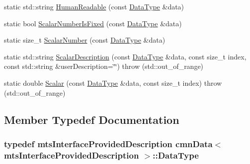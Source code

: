 \begin{DoxyCompactItemize}
\item 
static std\-::string \hyperlink{classcmn_data_3_01mts_interface_provided_description_01_4_ab45ebb352f76f32dc5d39ed6492370ad}{Human\-Readable} (const \hyperlink{classcmn_data_3_01mts_interface_provided_description_01_4_af19cd473dc5065308646606d55246bc6}{Data\-Type} \&data)
\item 
static bool \hyperlink{classcmn_data_3_01mts_interface_provided_description_01_4_a09ac4bf1060374d60412dbc8b19436f0}{Scalar\-Number\-Is\-Fixed} (const \hyperlink{classcmn_data_3_01mts_interface_provided_description_01_4_af19cd473dc5065308646606d55246bc6}{Data\-Type} \&data)
\item 
static size\-\_\-t \hyperlink{classcmn_data_3_01mts_interface_provided_description_01_4_ab66bf49c31e15615e90eb7e0dfdd7022}{Scalar\-Number} (const \hyperlink{classcmn_data_3_01mts_interface_provided_description_01_4_af19cd473dc5065308646606d55246bc6}{Data\-Type} \&data)
\item 
static std\-::string \hyperlink{classcmn_data_3_01mts_interface_provided_description_01_4_a609370f71724a052a4da55025660c23c}{Scalar\-Description} (const \hyperlink{classcmn_data_3_01mts_interface_provided_description_01_4_af19cd473dc5065308646606d55246bc6}{Data\-Type} \&data, const size\-\_\-t index, const std\-::string \&user\-Description=\char`\"{}\char`\"{})  throw (std\-::out\-\_\-of\-\_\-range)
\item 
static double \hyperlink{classcmn_data_3_01mts_interface_provided_description_01_4_a069b403ae749f6c19e71a339c82c9188}{Scalar} (const \hyperlink{classcmn_data_3_01mts_interface_provided_description_01_4_af19cd473dc5065308646606d55246bc6}{Data\-Type} \&data, const size\-\_\-t index)  throw (std\-::out\-\_\-of\-\_\-range)
\end{DoxyCompactItemize}


\subsection{Member Typedef Documentation}
\hypertarget{classcmn_data_3_01mts_interface_provided_description_01_4_af19cd473dc5065308646606d55246bc6}{
\subsubsection[{Data\-Type}]{\setlength{\rightskip}{0pt plus 5cm}typedef {\bf mts\-Interface\-Provided\-Description} {\bf cmn\-Data}$<$ {\bf mts\-Interface\-Provided\-Description} $>$\-::{\bf Data\-Type}}}\label{classcmn_data_3_01mts_interface_provided_description_01_4_af19cd473dc5065308646606d55246bc6}


